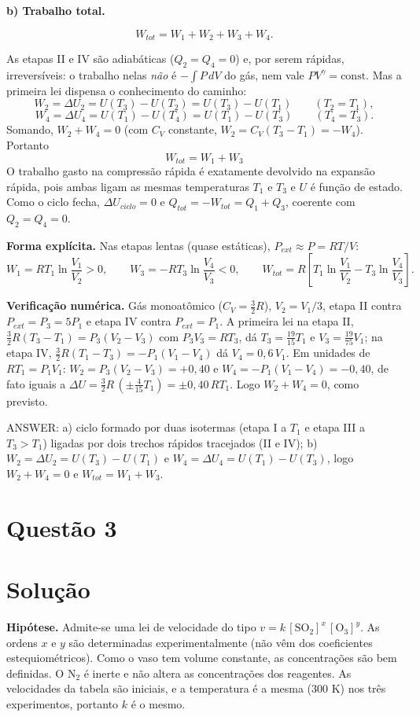 \documentclass{article}%
\begin{document}
\medskip\noindent\textbf{b) Trabalho total.}

\[
W_{tot}=W_1+W_2+W_3+W_4 .
\]

As etapas II e IV são adiabáticas ($Q_2=Q_4=0$) e, por serem rápidas, irreversíveis: o trabalho nelas \emph{não} é $-\int P\,dV$ do gás, nem vale $PV^{\gamma}=\text{const}$. Mas a primeira lei dispensa o conhecimento do caminho:
\[
W_2=\Delta U_2=U(T_3)-U(T_2)=U(T_3)-U(T_1)\qquad(T_2=T_1),
\]
\[
W_4=\Delta U_4=U(T_1)-U(T_4)=U(T_1)-U(T_3)\qquad(T_4=T_3).
\]
Somando, $W_2+W_4=0$ (com $C_V$ constante, $W_2=C_V(T_3-T_1)=-W_4$). Portanto
\[
\boxed{W_{tot}=W_1+W_3}
\]
O trabalho gasto na compressão rápida é exatamente devolvido na expansão rápida, pois ambas ligam as mesmas temperaturas $T_1$ e $T_3$ e $U$ é função de estado. Como o ciclo fecha, $\Delta U_{ciclo}=0$ e $Q_{tot}=-W_{tot}=Q_1+Q_3$, coerente com $Q_2=Q_4=0$.

\textbf{Forma explícita.} Nas etapas lentas (quase estáticas), $P_{ext}\approx P=RT/V$:
\[
W_1=RT_1\ln\frac{V_1}{V_2}>0,\qquad W_3=-RT_3\ln\frac{V_4}{V_3}<0,\qquad
W_{tot}=R\left[T_1\ln\frac{V_1}{V_2}-T_3\ln\frac{V_4}{V_3}\right].
\]

\textbf{Verificação numérica.} Gás monoatômico ($C_V=\tfrac32R$), $V_2=V_1/3$, etapa II contra $P_{ext}=P_3=5P_1$ e etapa IV contra $P_{ext}=P_1$. A primeira lei na etapa II, $\tfrac32R(T_3-T_1)=P_3(V_2-V_3)$ com $P_3V_3=RT_3$, dá $T_3=\tfrac{19}{15}T_1$ e $V_3=\tfrac{19}{75}V_1$; na etapa IV, $\tfrac32R(T_1-T_3)=-P_1(V_1-V_4)$ dá $V_4=0{,}6\,V_1$. Em unidades de $RT_1=P_1V_1$: $W_2=P_3(V_2-V_3)=+0{,}40$ e $W_4=-P_1(V_1-V_4)=-0{,}40$, de fato iguais a $\Delta U=\tfrac32R\,(\pm\tfrac{4}{15}T_1)=\pm0{,}40\,RT_1$. Logo $W_2+W_4=0$, como previsto.

\medskip
ANSWER: a) ciclo formado por duas isotermas (etapa I a $T_1$ e etapa III a $T_3>T_1$) ligadas por dois trechos rápidos tracejados (II e IV); b) $W_2=\Delta U_2=U(T_3)-U(T_1)$ e $W_4=\Delta U_4=U(T_1)-U(T_3)$, logo $W_2+W_4=0$ e $W_{tot}=W_1+W_3$.%
\newpage%
\section*{Questão 3}

\section*{Solução}

\textbf{Hipótese.} Admite-se uma lei de velocidade do tipo $v = k\,[\mathrm{SO_2}]^{x}\,[\mathrm{O_3}]^{y}$. As ordens $x$ e $y$ são determinadas experimentalmente (não vêm dos coeficientes estequiométricos). Como o vaso tem volume constante, as concentrações são bem definidas. O $\mathrm{N_2}$ é inerte e não altera as concentrações dos reagentes. As velocidades da tabela são iniciais, e a temperatura é a mesma (300 K) nos três experimentos, portanto $k$ é o mesmo.
\end{document}
